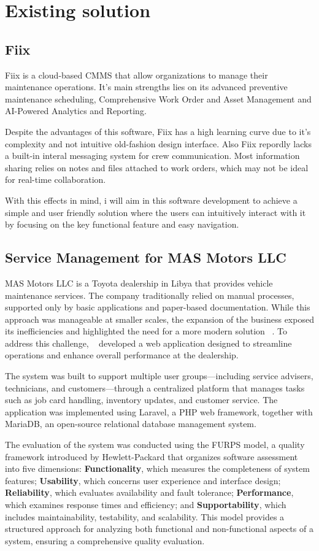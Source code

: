 \section{Existing solution}

\subsection{Fiix}
Fiix is a cloud-based \ac{CMMS} that allow organizations to manage their maintenance operations. 
It's main strengths lies on its advanced preventive maintenance scheduling, Comprehensive Work Order and Asset Management and AI-Powered Analytics and Reporting.

Despite the advantages of this software, Fiix has a high learning curve due to it's complexity and not intuitive old-fashion design interface. 
Also Fiix repordly lacks a built-in interal messaging system for crew communication. Most information sharing relies on notes and files attached to work orders, which may not be ideal for real-time collaboration.

With this effects in mind, i will aim in this software development to achieve a simple and user friendly solution where the users can intuitively interact with it by focusing on the key functional feature and easy navigation.

\subsection{Service Management for MAS Motors LLC}
MAS Motors LLC is a Toyota dealership in Libya that provides vehicle maintenance services. The company traditionally relied on manual processes, supported only by basic applications and paper-based documentation. While this approach was manageable at smaller scales, the expansion of the business exposed its inefficiencies and highlighted the need for a more modern solution ~\cite{MAS_MOTORS}. To address this challenge, ~\citet{MAS_MOTORS} developed a web application designed to streamline operations and enhance overall performance at the dealership.

The system was built to support multiple user groups—including service advisers, technicians, and customers—through a centralized platform that manages tasks such as job card handling, inventory updates, and customer service. The application was implemented using Laravel, a PHP web framework, together with MariaDB, an open-source relational database management system.

The evaluation of the system was conducted using the \ac{FURPS} model, a quality framework introduced by Hewlett-Packard that organizes software assessment into five dimensions: \textbf{Functionality}, which measures the completeness of system features; \textbf{Usability}, which concerns user experience and interface design; \textbf{Reliability}, which evaluates availability and fault tolerance; \textbf{Performance}, which examines response times and efficiency; and \textbf{Supportability}, which includes maintainability, testability, and scalability. This model provides a structured approach for analyzing both functional and non-functional aspects of a system, ensuring a comprehensive quality evaluation. ~\cite{furps}

